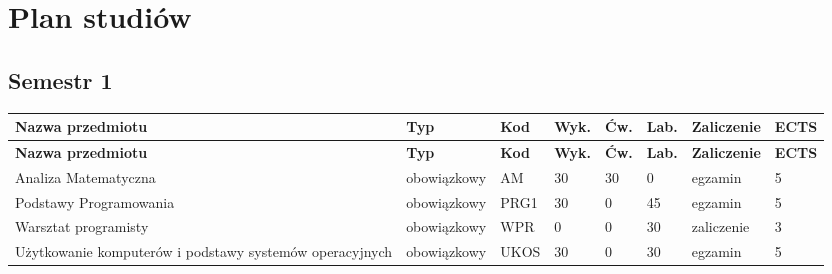 \documentclass[12pt,a4paper]{article}
\newcommand{\thdrule}{\noalign{\global\setlength{\extrarowheight}{0pt}}}
\newcommand{\thdend}{\noalign{\global\setlength{\extrarowheight}{4pt}}}
\begin{document}
\newpage

\section{Plan studiów}


\bigskip

\subsection*{Semestr 1}

{\scriptsize
\begin{longtable}{m{5.0cm}m{1.9cm}m{0.75cm}m{0.85cm}m{0.85cm}m{0.85cm}m{1.45cm}m{0.9cm}}
\thdrule\toprule
\rowcolor{pjatkRed}
{\color{white}\footnotesize\textbf{\vphantom{Ag}Nazwa przedmiotu}} & {\color{white}\footnotesize\textbf{\vphantom{Ag}Typ}} & {\color{white}\footnotesize\textbf{\vphantom{Ag}Kod}} & {\color{white}\footnotesize\textbf{\vphantom{Ag}Wyk.}} & {\color{white}\footnotesize\textbf{\vphantom{Ag}Ćw.}} & {\color{white}\footnotesize\textbf{\vphantom{Ag}Lab.}} & {\color{white}\footnotesize\textbf{\vphantom{Ag}Zaliczenie}} & {\color{white}\footnotesize\textbf{\vphantom{Ag}ECTS}} \\
\midrule\thdend
\endfirsthead
\thdrule\toprule
\rowcolor{pjatkRed}
{\color{white}\footnotesize\textbf{\vphantom{Ag}Nazwa przedmiotu}} & {\color{white}\footnotesize\textbf{\vphantom{Ag}Typ}} & {\color{white}\footnotesize\textbf{\vphantom{Ag}Kod}} & {\color{white}\footnotesize\textbf{\vphantom{Ag}Wyk.}} & {\color{white}\footnotesize\textbf{\vphantom{Ag}Ćw.}} & {\color{white}\footnotesize\textbf{\vphantom{Ag}Lab.}} & {\color{white}\footnotesize\textbf{\vphantom{Ag}Zaliczenie}} & {\color{white}\footnotesize\textbf{\vphantom{Ag}ECTS}} \\
\midrule\thdend
\endhead
\rowcolor{tableRowLight} Analiza Matematyczna & {\scriptsize obowiązkowy} & AM & 30 & 30 & 0 & {\scriptsize egzamin} & 5 \\
\rowcolor{tableRowAlt} Podstawy Programowania & {\scriptsize obowiązkowy} & PRG1 & 30 & 0 & 45 & {\scriptsize egzamin} & 5 \\
\rowcolor{tableRowLight} Warsztat programisty & {\scriptsize obowiązkowy} & WPR & 0 & 0 & 30 & {\scriptsize zaliczenie} & 3 \\
\rowcolor{tableRowAlt} Użytkowanie komputerów i podstawy systemów operacyjnych & {\scriptsize obowiązkowy} & UKOS & 30 & 0 & 30 & {\scriptsize egzamin} & 5 \\

\end{longtable}}
\end{document}
